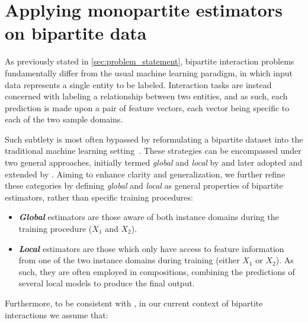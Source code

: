 \section{Applying monopartite estimators on bipartite data}
\label{sec:common_approaches}

As previously stated in \autoref{sec:problem_statement}, bipartite interaction problems fundamentally differ from the usual machine learning paradigm, in which input data represents a single entity to be labeled. Interaction tasks are instead concerned with labeling a relationship between two entities, and as such, each prediction is made upon a pair of feature vectors, each vector being specific to each of the two sample domains.

Such subtlety is most often bypassed by reformulating a bipartite dataset into the traditional machine learning setting~\cite{vert2008reconstruction}.
%
These strategies can be encompassed under two general approaches, initially termed \emph{global} and \emph{local} by \citet{vert2008reconstruction} and later adopted and extended by \citet{sschrynemackers2015}.  %
Aiming to enhance clarity and generalization, we further refine these categories by defining \emph{global} and \emph{local} as general properties of bipartite estimators, rather than specific training procedures:

\begin{itemize}
    \item \emph{\textbf{Global}} estimators are those aware of both instance domains during the training procedure ($X_1$ and $X_2$).
    \item \emph{\textbf{Local}} estimators are those which only have access to feature information from one of the two instance domains during training (either $X_1$ or $X_2$).
    As such, they are often employed in compositions, combining the predictions of several local models to produce the final output.
\end{itemize}

Furthermore, to be consistent with \citet{pliakos2018,pliakos2019,pliakos2020}, in our current context of bipartite interactions we assume that:


